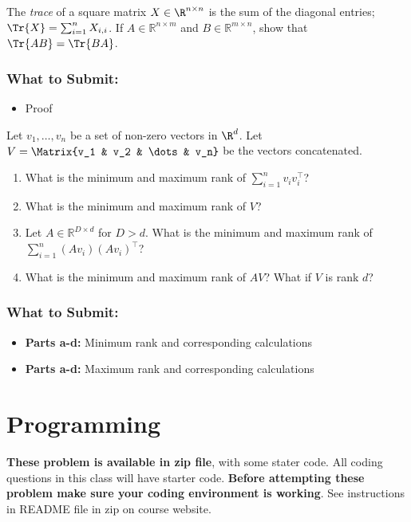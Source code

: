 \documentclass{article}
\begin{document}
\begin{bprob}
     The \textit{trace} of a square matrix $X\in\R^{n\times n}$ is the sum of the diagonal entries; $\Tr{X} = \sum_{i=1}^n X_{i,i}$. If $A\in\mathbb{R}^{n\times m}$ and $B\in\mathbb{R}^{m\times n}$, show that $\Tr{AB} = \Tr{BA}$.
    \subsubsection*{What to Submit:}
    \begin{itemize}
        \item Proof
    \end{itemize}
\end{bprob}

\begin{bprob}
     Let $v_1,\ldots,v_n$ be a set of non-zero vectors in $\R^d$. Let $V = \Matrix{v_1 & v_2 & \dots & v_n}$ be the vectors concatenated. 
    \begin{enumerate}
        \item What is the minimum and maximum rank of $\sum_{i=1}^n v_i v_i^\top$?
        \item What is the minimum and maximum rank of $V$?
        \item Let $A \in \mathbb{R}^{D \times d}$ for $D > d$. What is the minimum and maximum rank of $\sum_{i=1}^n (A v_i) (A v_i)^\top$?
        \item What is the minimum and maximum rank of $AV$? What if $V$ is rank $d$?
    \end{enumerate}
    \subsubsection*{What to Submit:}
    \begin{itemize}
        \item \textbf{Parts a-d:} Minimum rank and corresponding calculations
        \item \textbf{Parts a-d:} Maximum rank and corresponding calculations
    \end{itemize}
\end{bprob}


\section*{Programming}
\textbf{These problem is available in zip file}, with some stater code. All coding questions in this class will have starter code.
\textbf{Before attempting these problem make sure your coding environment is working}. See instructions in README file in zip on course website.
\end{document}
